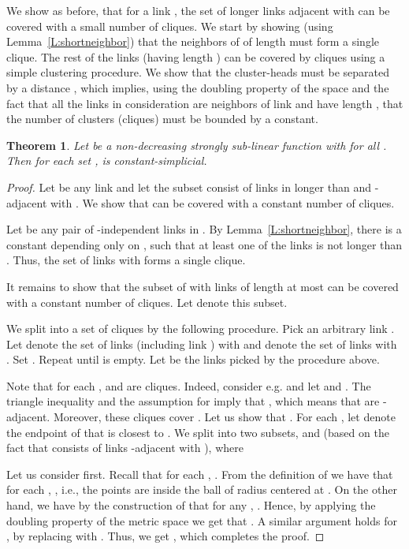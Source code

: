 \documentclass[11pt]{article}
\newtheorem{theorem}{Theorem}
\begin{document}
\medskip

We show as before, that for a link ,  the set of longer links adjacent with  can be covered with a small number of cliques. We start by showing (using Lemma~\ref{L:shortneighbor}) that the neighbors of  of length  must form a single clique. The rest of the links (having length ) can be covered by cliques using a simple clustering procedure. We show that the cluster-heads  must be separated by a distance , which implies, using the doubling property of the space and the fact that all the links in consideration are neighbors of link  and have length , that the number of clusters (cliques) must be bounded by a constant.

\begin{theorem}\label{T:perfectness}
Let  be a non-decreasing strongly sub-linear function with  for all . Then for each set ,  is constant-simplicial.
\end{theorem}
\begin{proof}
Let  be any link and let the subset  consist of links in  longer than  and -adjacent with . We show that  can be covered with a constant number of cliques.

Let  be any pair of -independent links in . By Lemma~\ref{L:shortneighbor}, there is a constant  depending only on , such that at least one of the links  is not longer than . Thus, the set of links  with  forms a single clique.

It remains to show that the subset of  with links of length at most  can be covered with a constant number of cliques. Let  denote this subset. 

We split  into a set of cliques by the following procedure. Pick an arbitrary link . Let  denote the set of links  (including link ) with  and  denote the set of links  with . Set . Repeat until  is empty. Let  be the links picked by the procedure above. 

Note that for each ,  and  are cliques. Indeed, consider e.g.  and let  and . The triangle inequality and the assumption  for  imply that , which means that  are -adjacent. Moreover, these cliques cover . Let us show that . For each , let  denote the endpoint of  that is closest to . We split  into two subsets,  and  (based on the fact that  consists of links -adjacent with ), where

Let us consider  first. Recall that for each , . From the definition of  we have that for each , , i.e., the points  are inside the ball of radius  centered at . On the other hand, we have by the construction of  that for any , . Hence, by applying the doubling property of the metric space we get that . 
A similar argument holds for , by replacing  with . Thus, we get , which completes the proof.
\end{proof}
\end{document}
